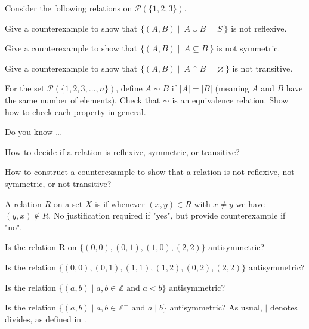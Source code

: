 \begin{exer}[\exerU] %
\label{exer_ppty_rel_power_set}
    Consider the following relations on $\mathscr{P}(\{1,2,3\})$.        
        \begin{exerpart}
            \item Give a counterexample to show that $\{(A,B) \mid ~ A \cup B = S ~ \}$ is not reflexive. 
            \item Give a counterexample to show that $\{(A,B) \mid ~ A \subseteq B~ \}$ is not symmetric.
            \item Give a counterexample to show that $\{(A,B) \mid ~ A \cap B = \varnothing ~ \}$ is not transitive.
        \end{exerpart}
\end{exer}

\begin{exer}[\exerU] %
\label{exer_prove_same_size_set_equiv_rel}
    For the set $\mathscr{P}(\{1,2,3, \ldots, n\})$, define $A \sim B$ if $|A| = |B|$ (meaning $A$ and $B$ have the same number of elements). Check that $\sim$ is an equivalence relation.  Show how to check each property in general.
\end{exer}

\begin{exer}[\exerR] %
\label{exer_dyk_ppty_rel}
    Do you know \ldots
        \begin{exerpart}
            \item How to decide if a relation is reflexive, symmetric, or transitive?
            \item How to construct a counterexample to show that a relation is not reflexive, not symmetric, or not transitive?
        \end{exerpart}
\end{exer}

\begin{exer}[\exerE] %
\label{exer_defn_antisym}
    A relation $R$ on a set $X$ is  if whenever $(x,y) \in R$ with $x \neq y$ we have $(y,x) \notin R$. No justification required if "yes", but provide counterexample if "no". 
        \begin{exerpart}
            \item Is the relation R on $\{(0,0), (0,1), (1,0), (2,2)\}$ antisymmetric? 
            \item Is the relation $\{(0,0), (0,1), (1,1), (1,2), (0,2), (2,2)\}$ antisymmetric? 
            \item Is the relation $\{ (a,b) \mid a, b  \in \mathbb{Z} \text{ and } a < b \}$  antisymmetric? 
            \item Is the relation $\{ (a,b) \mid a, b  \in \mathbb{Z}^+ \text{ and } a \mid b \}$  antisymmetric? As usual, $\mid$ denotes divides, as defined in .
        \end{exerpart}
\end{exer}

